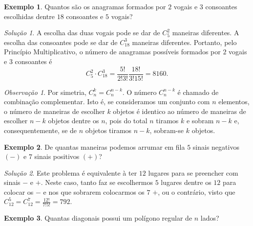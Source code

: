 \documentclass[]{book}
\theoremstyle{definition}
\theoremstyle{definition}
\newtheorem{example}{Exemplo}[chapter]
\theoremstyle{definition}
\theoremstyle{remark}
\newtheorem*{remark}{Observação}
\newtheorem*{solution}{Solução}
\begin{document}
\begin{example}
\protect\hypertarget{exm:unnamed-chunk-50}{}{\label{exm:unnamed-chunk-50} }Quantos são os anagramas formados por \(2\) vogais e \(3\) consoantes escolhidas dentre \(18\) consoantes e \(5\) vogais?
\end{example}

\begin{solution}
\iffalse{} {Solução. } \fi{}A escolha das duas vogais pode se dar de \(C^2_5\) maneiras diferentes.
A escolha das consoantes pode se dar de \(C^3_{18}\) maneiras diferentes.
Portanto, pelo Princípio Multiplicativo, o número de anagramas possíveis formados por \(2\) vogais e \(3\) consoantes é
\[C^2_5 \cdot C^3_{18} = \frac{5!}{2!3!}\frac{18!}{3!15!}=8160.\]
\end{solution}

\begin{remark}
\iffalse{} {Observação. } \fi{}Por simetria, \(C^{k}_{n} = C^{n-k}_n\).
O número \(C^{n-k}_n\) é chamado de combinação complementar.
Isto é, se consideramos um conjunto com \(n\) elementos, o número de maneiras de escolher \(k\) objetos é identico ao número de maneiras de escolher \(n-k\) objetos dentre os \(n\), pois do total \(n\) tiramos \(k\) e sobram \(n-k\) e, consequentemente, se de \(n\) objetos tiramos \(n-k\), sobram-se \(k\) objetos.
\end{remark}

\begin{example}
\protect\hypertarget{exm:unnamed-chunk-53}{}{\label{exm:unnamed-chunk-53} }De quantas maneiras podemos arrumar em fila \(5\) sinais negativos \((-)\) e \(7\) sinais positivos \((+)\)?
\end{example}

\begin{solution}
\iffalse{} {Solução. } \fi{}Este problema é equivalente à ter \(12\) lugares para se preencher com sinais \(-\) e \(+\).
Neste caso, tanto faz se escolhermos \(5\) lugares dentre os \(12\) para colocar os \(-\) e nos que sobrarem colocarmos os \(7\) \(+\), ou o contrário, visto que \(C^{5}_{12} = C^{7}_{12} = \frac{12!}{7!5!}=792.\)
\end{solution}

\begin{example}
\protect\hypertarget{exm:unnamed-chunk-55}{}{\label{exm:unnamed-chunk-55} }Quantas diagonais possui um polígono regular de \(n\) lados?
\end{example}
\end{document}

